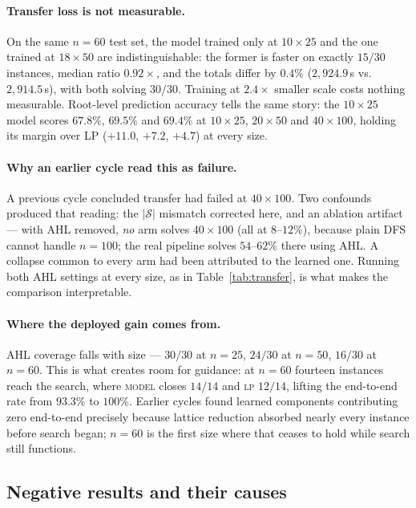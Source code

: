 \documentclass[12pt]{article}
\begin{document}
\paragraph{Transfer loss is not measurable.} On the same $n=60$ test set, the model trained only at $10\times25$ and the one trained at $18\times50$ are indistinguishable: the former is faster on exactly $15/30$ instances, median ratio $0.92\times$, and the totals differ by $0.4\%$ ($2{,}924.9$\,s vs.\ $2{,}914.5$\,s), with both solving $30/30$. Training at $2.4\times$ smaller scale costs nothing measurable. Root-level prediction accuracy tells the same story: the $10\times25$ model scores $67.8\%$, $69.5\%$ and $69.4\%$ at $10\times25$, $20\times50$ and $40\times100$, holding its margin over LP ($+11.0$, $+7.2$, $+4.7$) at every size.

\paragraph{Why an earlier cycle read this as failure.} A previous cycle concluded transfer had failed at $40\times100$. Two confounds produced that reading: the $|\mathcal{S}|$ mismatch corrected here, and an ablation artifact --- with AHL removed, \emph{no} arm solves $40\times100$ (all at $8$--$12\%$), because plain DFS cannot handle $n=100$; the real pipeline solves $54$--$62\%$ there using AHL. A collapse common to every arm had been attributed to the learned one. Running both AHL settings at every size, as in Table~\ref{tab:transfer}, is what makes the comparison interpretable.

\paragraph{Where the deployed gain comes from.} AHL coverage falls with size --- $30/30$ at $n=25$, $24/30$ at $n=50$, $16/30$ at $n=60$. This is what creates room for guidance: at $n=60$ fourteen instances reach the search, where \textsc{model} closes $14/14$ and \textsc{lp} $12/14$, lifting the end-to-end rate from $93.3\%$ to $100\%$. Earlier cycles found learned components contributing zero end-to-end precisely because lattice reduction absorbed nearly every instance before search began; $n=60$ is the first size where that ceases to hold while search still functions.

\subsection{Negative results and their causes}
\label{sec:negatives}
\end{document}
